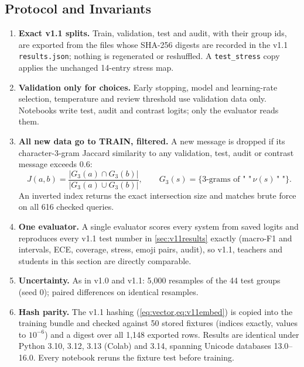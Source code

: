\documentclass[11pt,a4paper]{article}
\theoremstyle{remark}
\begin{document}
\subsection{Protocol and Invariants}
\label{sec:v12protocol}

\begin{enumerate}
  \item \textbf{Exact v1.1 splits.} Train, validation, test and audit, with their group ids, are exported from the files whose SHA-256 digests are recorded in the v1.1 \texttt{results.json}; nothing is regenerated or reshuffled. A \texttt{test\_stress} copy applies the unchanged 14-entry stress map.
  \item \textbf{Validation only for choices.} Early stopping, model and learning-rate selection, temperature and review threshold use validation data only. Notebooks write test, audit and contrast logits; only the evaluator reads them.
  \item \textbf{All new data go to TRAIN, filtered.} A new message is dropped if its character-3-gram Jaccard similarity to any validation, test, audit or contrast message exceeds $0.6$:
  \begin{equation}
    J(a,b) = \frac{|G_3(a)\cap G_3(b)|}{|G_3(a)\cup G_3(b)|},\qquad G_3(s)=\{\text{3-grams of } \texttt{"\ "}\,\nu(s)\,\texttt{"\ "}\}.
    \label{eq:v12jaccard}
  \end{equation}
  An inverted index returns the exact intersection size and matches brute force on all 616 checked queries.
  \item \textbf{One evaluator.} A single evaluator scores every system from saved logits and reproduces every v1.1 test number in \cref{sec:v11results} exactly (macro-F1 and intervals, ECE, coverage, stress, emoji pairs, audit), so v1.1, teachers and students in this section are directly comparable.
  \item \textbf{Uncertainty.} As in v1.0 and v1.1: 5{,}000 resamples of the 44 test groups (seed 0); paired differences on identical resamples.
  \item \textbf{Hash parity.} The v1.1 hashing (\cref{eq:vector,eq:v11embed}) is copied into the training bundle and checked against 50 stored fixtures (indices exactly, values to $10^{-6}$) and a digest over all 1{,}148 exported rows. Results are identical under Python 3.10, 3.12, 3.13 (Colab) and 3.14, spanning Unicode databases 13.0--16.0. Every notebook reruns the fixture test before training.
\end{enumerate}
\end{document}
